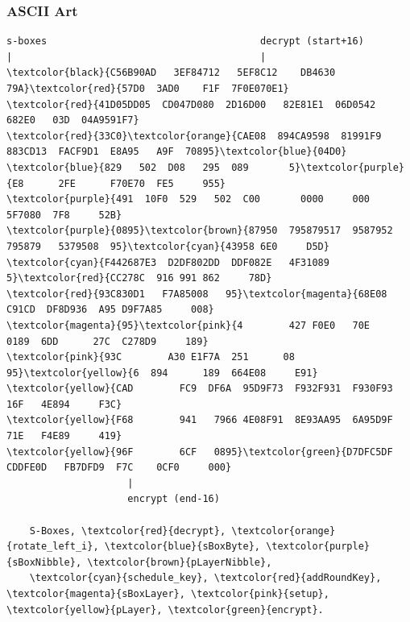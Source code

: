 \documentclass{beamer}
\begin{document}
\begin{frame}[fragile]
\frametitle{ASCII Art}
\scriptsize{
    \begin{Verbatim}[commandchars=\\\{\}]
s-boxes                                     decrypt (start+16)
|                                           |
\textcolor{black}{C56B90AD   3EF84712   5EF8C12    DB4630  79A}\textcolor{red}{57D0  3AD0    F1F  7F0E070E1}
\textcolor{red}{41D05DD05  CD047D080  2D16D00   82E81E1  06D0542  682E0   03D  04A9591F7}
\textcolor{red}{33C0}\textcolor{orange}{CAE08  894CA9598  81991F9   883CD13  FACF9D1  E8A95   A9F  70895}\textcolor{blue}{04D0}
\textcolor{blue}{829   502  D08   295  089       5}\textcolor{purple}{E8      2FE      F70E70  FE5     955}
\textcolor{purple}{491  10F0  529   502  C00       0000     000      5F7080  7F8     52B}
\textcolor{purple}{0895}\textcolor{brown}{87950  795879517  9587952   795879   5379508  95}\textcolor{cyan}{43958 6E0     D5D}
\textcolor{cyan}{F442687E3  D2DF802DD  DDF082E   4F31089  5}\textcolor{red}{CC278C  916 991 862     78D}
\textcolor{red}{93C830D1   F7A85008   95}\textcolor{magenta}{68E08     C91CD  DF8D936  A95 D9F7A85     008}
\textcolor{magenta}{95}\textcolor{pink}{4        427 F0E0   70E          0189  6DD      27C  C278D9     189}
\textcolor{pink}{93C        A30 E1F7A  251      08   95}\textcolor{yellow}{6  894      189  664E08     E91}
\textcolor{yellow}{CAD        FC9  DF6A  95D9F73  F932F931  F930F93  16F   4E894     F3C}
\textcolor{yellow}{F68        941   7966 4E08F91  8E93AA95  6A95D9F  71E   F4E89     419}
\textcolor{yellow}{96F        6CF   0895}\textcolor{green}{D7DFC5DF  CDDFE0D   FB7DFD9  F7C    0CF0     000}
                     |
                     encrypt (end-16)

    S-Boxes, \textcolor{red}{decrypt}, \textcolor{orange}{rotate_left_i}, \textcolor{blue}{sBoxByte}, \textcolor{purple}{sBoxNibble}, \textcolor{brown}{pLayerNibble},
    \textcolor{cyan}{schedule_key}, \textcolor{red}{addRoundKey}, \textcolor{magenta}{sBoxLayer}, \textcolor{pink}{setup}, \textcolor{yellow}{pLayer}, \textcolor{green}{encrypt}.
    \end{Verbatim}
}
\end{frame}
\end{document}
